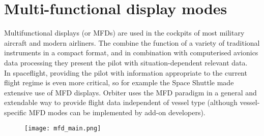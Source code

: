\documentclass[Orbiter User Manual.tex]{subfiles}
\begin{document}
\section{Multi-functional display modes}
Multifunctional displays (or MFDs) are used in the cockpits of most military aircraft and modern airliners. The combine the function of a variety of traditional instruments in a compact format, and in combination with computerised avionics data processing they present the pilot with situation-dependent relevant data.\\
In spaceflight, providing the pilot with information appropriate to the current flight regime is even more critical, so for example the Space Shuttle made extensive use of MFD displays. Orbiter uses the MFD paradigm in a general and extendable way to provide flight data independent of vessel type (although vessel-specific MFD modes can be implemented by add-on developers).

\begin{figure}[H]
  \centering
  \texttt{[image: mfd\_main.png]}
\end{figure}
\end{document}
